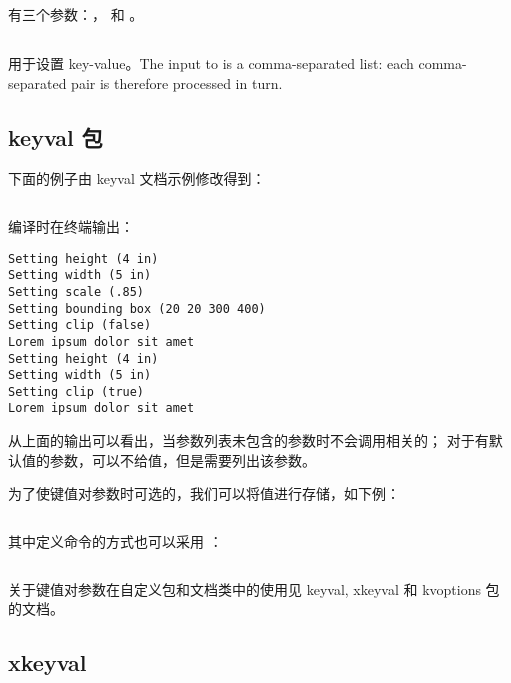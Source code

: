  有三个参数：，
 和 。

\subsection{\protect{}}

 用于设置 key-value。The input to  is a comma-separated list: each comma-separated  pair is therefore processed in turn. 

\subsection{ keyval 包}

下面的例子由 keyval 文档示例修改得到：

\inputminted[linenos]{latex}{examples/programming/keyval-command-with-parameters.tex}

编译时在终端输出：

\begin{verbatim}
Setting height (4 in)
Setting width (5 in)
Setting scale (.85)
Setting bounding box (20 20 300 400)
Setting clip (false)
Lorem ipsum dolor sit amet
Setting height (4 in)
Setting width (5 in)
Setting clip (true)
Lorem ipsum dolor sit amet
\end{verbatim}

从上面的输出可以看出，当参数列表未包含的参数时不会调用相关的；
对于有默认值的参数，可以不给值，但是需要列出该参数。

为了使键值对参数时可选的，我们可以将值进行存储，如下例：

\inputminted[linenos]{latex}{examples/programming/keyval-command-with-optional-parameters1.tex}

其中定义命令的方式也可以采用 ：

\inputminted[firstline=30,lastline=42]{latex}{examples/programming/keyval-command-with-optional-parameters2.tex}

关于键值对参数在自定义包和文档类中的使用见 keyval, xkeyval 和 kvoptions 包的文档。

\subsection{xkeyval}

\inputminted{latex}{examples/programming/xkeyval-command-with-optional-parameters.tex}
 
